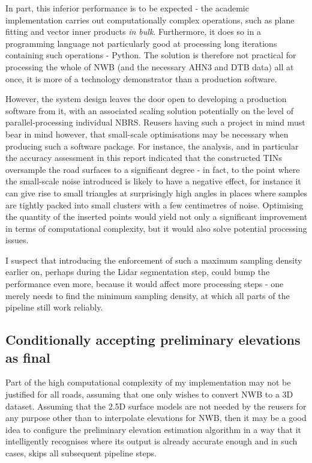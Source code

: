 In part, this inferior performance is to be expected - the academic implementation carries out computationally complex operations, such as plane fitting and vector inner products \textit{in bulk}. Furthermore, it does so in a programming language not particularly good at processing long iterations containing such operations - Python. The solution is therefore not practical for processing the whole of NWB (and the necessary AHN3 and DTB data) all at once, it is more of a technology demonstrator than a production software.

However, the system design leaves the door open to developing a production software from it, with an associated scaling solution potentially on the level of parallel-processing individual NBRS. Reusers having such a project in mind must bear in mind however, that small-scale optimisations may be necessary when producing such a software package. For instance, the analysis, and in particular the accuracy assessment in this report indicated that the constructed TINs oversample the road surfaces to a significant degree - in fact, to the point where the small-scale noise introduced is likely to have a negative effect, for instance it can give rise to small triangles at surprisingly high angles in places where samples are tightly packed into small clusters with a few centimetres of noise. Optimising the quantity of the inserted points would yield not only a significant improvement in terms of computational complexity, but it would also solve potential processing issues.

I suspect that introducing the enforcement of such a maximum sampling density earlier on, perhaps during the Lidar segmentation step, could bump the performance even more, because it would affect more processing steps - one merely needs to find the minimum sampling density, at which all parts of the pipeline still work reliably.

\subsection{Conditionally accepting preliminary elevations as final}
\label{sub:preliminaryelevationsasfinal}

Part of the high computational complexity of my implementation may not be justified for all roads, assuming that one only wishes to convert NWB to a 3D dataset. Assuming that the 2.5D surface models are not needed by the reusers for any purpose other than to interpolate elevations for NWB, then it may be a good idea to configure the preliminary elevation estimation algorithm in a way that it intelligently recognises where its output is already accurate enough and in such cases, skips all subsequent pipeline steps.

